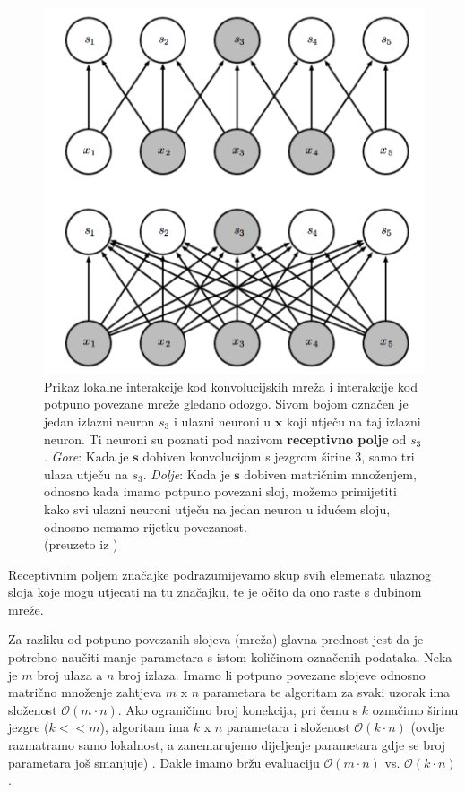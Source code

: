 \documentclass[times, utf8, diplomski]{fer}
\theoremstyle{definition}
\begin{document}
\begin{figure}[!htb]
\centering
\includegraphics[scale=0.25]{lokalna_povetanost_odozgo.png}
\caption{Prikaz lokalne interakcije kod konvolucijskih mreža i interakcije kod potpuno povezane mreže gledano odozgo. Sivom bojom označen je jedan izlazni neuron $s_3$ i ulazni neuroni u $\bm{x}$ koji utječu na taj izlazni neuron. Ti neuroni su poznati pod nazivom \textbf{receptivno polje}  od $s_3$. \textit{Gore}: Kada je $\bm{s}$ dobiven konvolucijom s jezgrom širine 3, samo tri ulaza utječu na $s_3$. \textit{Dolje}: Kada je $\bm{s}$ dobiven matričnim množenjem, odnosno kada imamo potpuno povezani sloj, možemo primijetiti kako svi ulazni neuroni utječu na jedan neuron u idućem sloju, odnosno nemamo rijetku povezanost. \\ (preuzeto iz \cite{Goodfellow-et-al-2016}) }
\end{figure}
Receptivnim poljem značajke podrazumijevamo skup svih elemenata ulaznog sloja koje mogu utjecati na tu značajku, te je očito da ono raste s dubinom mreže.\newline

Za razliku od potpuno povezanih slojeva (mreža) glavna prednost jest da je potrebno naučiti manje parametara s istom količinom označenih podataka. Neka je $m$ broj ulaza a $n$ broj izlaza. Imamo li potpuno povezane slojeve odnosno matrično množenje zahtjeva $m$ x $n$ parametara te algoritam za svaki uzorak ima složenost $\mathcal{O}(m \cdot n)$. Ako ograničimo broj konekcija, pri čemu s $k$ označimo širinu jezgre ($k << m$), algoritam ima $k$ x $n$ parametara i složenost $\mathcal{O}(k \cdot n)$ (ovdje razmatramo samo lokalnost, a zanemarujemo dijeljenje parametara gdje se broj parametara još smanjuje) . Dakle imamo bržu evaluaciju $\mathcal{O}(m\cdot n)$ vs. $\mathcal{O}(k\cdot n)$.
\end{document}

